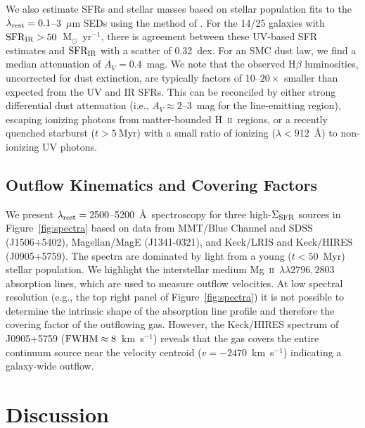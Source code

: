 \documentclass[12pt,preprint]{aastex}
\newcommand{\kms}{km~s$^{-1}$}
\newcommand{\mgii}{\textrm{Mg}~\textsc{ii}}
\newcommand{\hii}{\textrm{H}~\textsc{ii}}
\newcommand{\msun}{M$_{\odot}$}
\newcommand{\lrest}{\lambda_{\textnormal{\scriptsize{rest}}}}
\newcommand{\sigmasfr}{\Sigma_{\textnormal{\scriptsize{SFR}}}}
\newcommand{\sfrir}{\textnormal{SFR}_{\textnormal{\scriptsize{IR}}}}
\begin{document}
We also estimate SFRs and stellar masses based on stellar population
fits to the $\lrest=0.1$--3~$\mu$m SEDs using the method of
\citet{mou11}.  For the 14/25 galaxies with
$\sfrir>50$~\msun~yr$^{-1}$, there is agreement between these UV-based
SFR estimates and $\sfrir$ with a scatter of 0.32~dex.  For an SMC
dust law, we find a median attenuation of $A_V=0.4$~mag.  We note that
the observed H$\beta$ luminosities, uncorrected for dust extinction,
are typically factors of 10--$20\times$ smaller than expected from the
UV and IR SFRs.  This can be reconciled by either strong differential
dust attenuation (i.e., $A_V\approx2$--3~mag for the line-emitting
region), escaping ionizing photons from matter-bounded \hii\ regions,
or a recently quenched starburst ($t>5~$Myr) with a small ratio of
ionizing ($\lambda<912$~\AA) to non-ionizing UV photons.




\subsection{Outflow Kinematics and Covering Factors}

We present $\lrest=2500$--5200~\AA\ spectroscopy for three
high-$\sigmasfr$ sources in Figure~\ref{fig:spectra} based on data
from MMT/Blue Channel and SDSS (J1506+5402), Magellan/MagE
(J1341-0321), and Keck/LRIS and Keck/HIRES (J0905+5759).  The spectra
are dominated by light from a young ($t<50$~Myr) stellar population.
We highlight the interstellar medium \mgii~$\lambda\lambda2796,2803$
absorption lines, which are used to measure outflow velocities.  At
low spectral resolution (e.g., the top right panel of
Figure~\ref{fig:spectra}) it is not possible to determine the
intrinsic shape of the absorption line profile and therefore the
covering factor of the outflowing gas.  However, the Keck/HIRES
spectrum of J0905+5759 ($\textnormal{FWHM}\approx8$~\kms) reveals that
the gas covers the entire continuum source near the velocity centroid
($v=-2470$~\kms) indicating a galaxy-wide outflow.


\section{Discussion}\label{sec:discussion}
\end{document}
